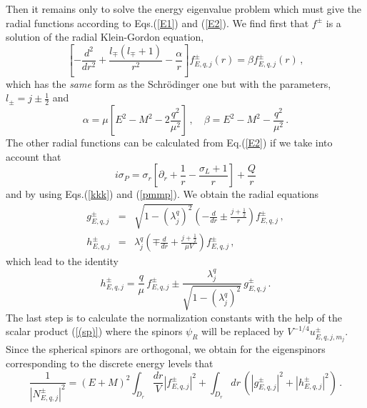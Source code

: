 \documentclass[a4paper,12pt]{article}
\begin{document}
Then it remains only to solve  the energy eigenvalue problem
which must give the radial functions  
according to Eqs.(\ref{E1}) and (\ref{E2}). We find first that $f^{\pm}$ 
is a solution of the radial Klein-Gordon equation,
\begin{equation}\label{(kgrad)}
\left[-\frac{d^2}{dr^2}+\frac{l_{\mp}(l_{\mp}+1)}{r^2}-\frac{\alpha}{r}\right]
f^{\pm}_{E,q,j}(r)=\beta f^{\pm}_{E,q,j}(r)\,, 
\end{equation}
which has the {\em same} form as the Schr\" odinger one \cite{CV} but with the 
parameters, $l_{\pm}=j\pm \frac{1}{2}$ and
\begin{equation}\label{(ab)}
\alpha=\mu\left[E^{2}-M^{2}-2\frac{q^2}{\mu^2}\right]\,,\quad
\beta=E^{2}-M^{2}-\frac{q^2}{\mu^2}\,.
\end{equation}
The other radial functions can be calculated from Eq.(\ref{E2}) if we take 
into account that
\begin{equation}
i\sigma_{P}=\sigma_{r}\left[\partial_{r}+\frac{1}{r}-\frac{\sigma_{L}+1}{r}
\right]+\frac{Q}{r}
\end{equation}
and by using Eqs.(\ref{kkk}) and (\ref{pmmp}). We obtain the radial 
equations 
\begin{eqnarray}
g^{\pm}_{E,q,j}&=&\sqrt{1-(\lambda^{q}_{j})^{2}}\left(-\frac{d}{dr}
\pm\frac{j+\frac{1}{2}}{r}\right)f^{\pm}_{E,q,j}\,,\\  
h^{\pm}_{E,q,j}&=&\lambda^{q}_{j}\left(\mp\frac{d}{dr}
+\frac{j+\frac{1}{2}}{\mu V}\right)f^{\pm}_{E,q,j}\,,
\end{eqnarray}
which lead to the identity
\begin{equation}
h^{\pm}_{E,q,j}=\frac{q}{\mu}\,f^{\pm}_{E,q,j}\pm 
\frac{\lambda^{q}_{j}}{\sqrt{1-(\lambda^{q}_{j})^2}}\,g^{\pm}_{E,q,j}\,.  
\end{equation}
The last step is to calculate the normalization constants with the help  
of the scalar product (\ref{(sp)}) where the spinors $\psi_{R}$ 
will be replaced by $V^{-1/4}u^{\pm}_{E,q,j,m_{j}}$. Since the spherical 
spinors are orthogonal, we obtain for the eigenspinors corresponding to 
the discrete energy levels that
\begin{equation}\label{(scprod1)}
\frac{1}{|N^{\pm}_{E,q,j}|^2}=(E+M)^{2}\int_{D_{r}}\frac{dr}{V} 
|f^{\pm}_{E,q,j}|^{2} +\int_{D_{r}}dr \,\left(
|g^{\pm}_{E,q,j}|^{2} +
|h^{\pm}_{E,q,j}|^{2} \right)\,.
\end{equation} 
   
\end{document}
